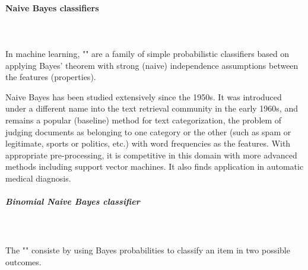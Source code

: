 	\paragraph{Naive Bayes classifiers}\mbox{}\\\\
	In machine learning, "" are a family of simple probabilistic classifiers based on applying Bayes' theorem with strong (naive) independence assumptions between the features (properties).

	Naive Bayes has been studied extensively since the 1950s. It was introduced under a different name into the text retrieval community in the early 1960s, and remains a popular (baseline) method for text categorization, the problem of judging documents as belonging to one category or the other (such as spam or legitimate, sports or politics, etc.) with word frequencies as the features. With appropriate pre-processing, it is competitive in this domain with more advanced methods including support vector machines. It also finds application in automatic medical diagnosis.
	
	\subparagraph{Binomial Naive Bayes classifier}\mbox{}\\\\
	The "" consiste by using Bayes probabilities to classify an item in two possible outcomes.
	
